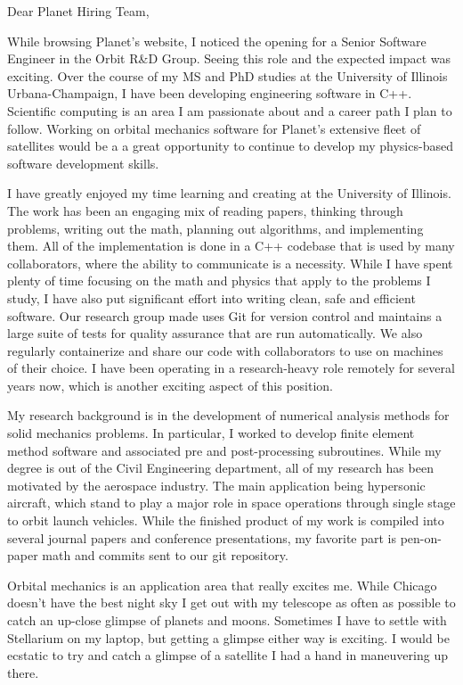 \documentclass{resume}
\begin{document}
\vspace{0.5in}
Dear Planet Hiring Team,

While browsing Planet's website, I noticed the opening for a Senior
Software Engineer in the Orbit R\&D Group.
%
Seeing this role and the expected impact was exciting.
%
Over the course of my MS and PhD studies at the University of Illinois
Urbana-Champaign, I have been developing engineering software in C++.
%
Scientific computing is an area I am passionate about and a career
path I plan to follow.
%
Working on orbital mechanics software for Planet's extensive fleet of
satellites would be a a great opportunity to continue to develop my
physics-based software development skills.
%

I have greatly enjoyed my time learning and creating at the University
of Illinois.
%
The work has been an engaging mix of reading papers, thinking through
problems, writing out the math, planning out algorithms, and
implementing them.
%
All of the implementation is done in a C++ codebase that
is used by many collaborators, where the ability to communicate
is a necessity. 
%
While I have spent plenty of time focusing on the math and physics
that apply to the problems I study, I have also put significant effort
into writing clean, safe and efficient software.
%
Our research group made uses Git for version control and maintains a
large suite of tests for quality assurance that are run automatically.
%
We also regularly containerize and share our code with collaborators
to use on machines of their choice.
%
I have been operating in a research-heavy role remotely for
several years now, which is another exciting aspect of this position.
%

My research background is in the development of numerical analysis
methods for solid mechanics problems.
%
In particular, I worked to develop finite element method software and
associated pre and post-processing subroutines.
%
While my degree is out of the Civil Engineering department, all of my
research has been motivated by the aerospace industry.
%
The main application being hypersonic aircraft, which stand to
play a major role in space operations through single stage to orbit
launch vehicles.
%
While the finished product of my work is compiled into several journal
papers and conference presentations, my favorite part is pen-on-paper math
and commits sent to our git repository.
%

Orbital mechanics is an application area that really excites me.
%
While Chicago doesn't have the best night sky I get out with my
telescope as often as possible to catch an up-close glimpse of planets
and moons.
%
Sometimes I have to settle with Stellarium on my laptop, but getting a
glimpse either way is exciting.
%
I would be ecstatic to try and catch a glimpse of a satellite I had a
hand in maneuvering up there.
%
\end{document}
